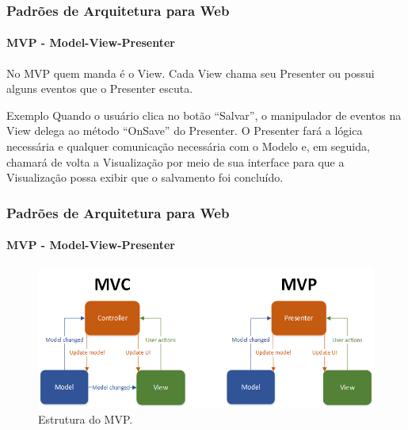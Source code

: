 \documentclass[
	9pt, %
	t, %
]{beamer}
\begin{document}
\begin{frame}
	\frametitle{Padrões de Arquitetura para Web}
	\framesubtitle{MVP - Model-View-Presenter}

	No MVP quem manda é o View. Cada View chama seu Presenter ou possui alguns eventos que o Presenter escuta.
	\begin{exampleblock}{Exemplo}
		Quando o usuário clica no botão “Salvar”, o manipulador de eventos na View delega ao método “OnSave” do Presenter. O Presenter fará a lógica necessária e qualquer comunicação necessária com o Modelo e, em seguida, chamará de volta a Visualização por meio de sua interface para que a Visualização possa exibir que o salvamento foi concluído.
	\end{exampleblock}

	
\end{frame}

\begin{frame}
	\frametitle{Padrões de Arquitetura para Web}
	\framesubtitle{MVP - Model-View-Presenter}

	\begin{figure}
		\centering
		\includegraphics[width=0.9\linewidth]{Images/mvc_mvp.png}
		\caption{Estrutura do MVP.}\label{fig:mvp}
	\end{figure}

\end{frame}
\end{document}
